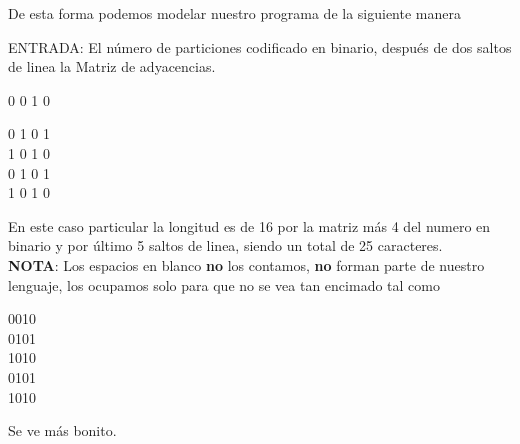 \documentclass[12pt,letterpaper]{article}
\begin{document}




\newpage
De esta forma podemos modelar nuestro programa de la siguiente manera

ENTRADA: El número de particiones codificado en binario, después de dos saltos de linea la Matriz de adyacencias.

\begin{center}
 0 0 1 0
 
 
 0 1 0 1 \\
 1 0 1 0\\
 0 1 0 1\\
 1 0 1 0 \\
\end{center}

En este caso particular la longitud es de 16 por la matriz más 4 del numero en binario y por último 5 saltos de linea, siendo un total de 25 caracteres.\\

\textbf{NOTA}: Los espacios en blanco \textbf{no} los contamos, \textbf{no} forman parte de nuestro lenguaje, los ocupamos solo para que no se vea tan encimado tal como
\begin{center}
 0010\\
 0101\\
 1010\\
 0101\\
 1010\\
\end{center}
Se ve más bonito.



\end{document}
